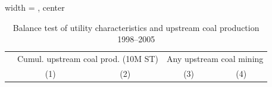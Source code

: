 
\begin{table}[htbp]
   
   \caption{\label{tab:pt_balance_6yr} Balance test of utility characteristics and upstream coal production 1998--2005}
   \bigskip
   
   \centering
   
   \begin{adjustbox}{width = \textwidth, center}
      
      
      \begin{tabular}{lrrrr}
         \toprule
         
           & \multicolumn{2}{c}{Cumul. upstream coal prod. (10M ST)} & \multicolumn{2}{c}{Any upstream coal mining} \\ 
         
                                         & \multicolumn{1}{c}{(1)}  & \multicolumn{1}{c}{(2)}  & \multicolumn{1}{c}{(3)}  & \multicolumn{1}{c}{(4)}\\   
         

\end{tabular}
\end{adjustbox}
\end{table}
